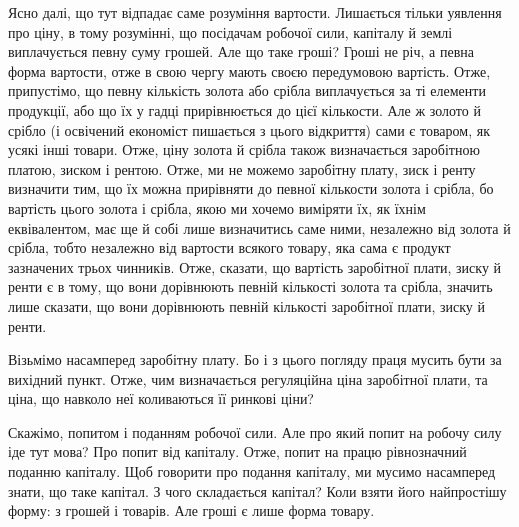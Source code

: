 Ясно далі, що тут відпадає саме розуміння вартости. Лишається тільки
уявлення про ціну, в тому розумінні, що посідачам робочої сили, капіталу
й землі виплачується певну суму грошей. Але що таке гроші? Гроші не річ,
а певна форма вартости, отже в свою чергу мають своєю передумовою вартість.
Отже, припустімо, що певну кількість золота або срібла виплачується за ті елементи
продукції, або що їх у гадці прирівнюється до цієї кількости. Але ж
золото й срібло (і освічений економіст пишається з цього відкриття) сами є
товаром, як усякі інші товари. Отже, ціну золота й срібла також визначається
заробітною платою, зиском і рентою. Отже, ми не можемо заробітну плату, зиск
і ренту визначити тим, що їх можна прирівняти до певної кількости золота
і срібла, бо вартість цього золота і срібла, якою ми хочемо виміряти їх, як їхнім
еквівалентом, має ще й собі лише визначитись саме ними, незалежно від золота
й срібла, тобто незалежно від вартости всякого товару, яка сама є продукт зазначених
трьох чинників. Отже, сказати, що вартість заробітної плати, зиску
й ренти є в тому, що вони дорівнюють певній кількості золота та срібла, значить
лише сказати, що вони дорівнюють певній кількості заробітної плати,
зиску й ренти.

Візьмімо насамперед заробітну плату. Бо і з цього погляду праця мусить
бути за вихідний пункт. Отже, чим визначається регуляційна ціна заробітної
плати, та ціна, що навколо неї коливаються її ринкові ціни?

Скажімо, попитом і поданням робочої сили. Але про який попит на робочу
силу іде тут мова? Про попит від капіталу. Отже, попит на працю рівнозначний
поданню капіталу. Щоб говорити про подання капіталу, ми мусимо
насамперед знати, що таке капітал. З чого складається капітал? Коли взяти
його найпростішу форму: з грошей і товарів. Але гроші є лише форма товару.
\parbreak{}  %
